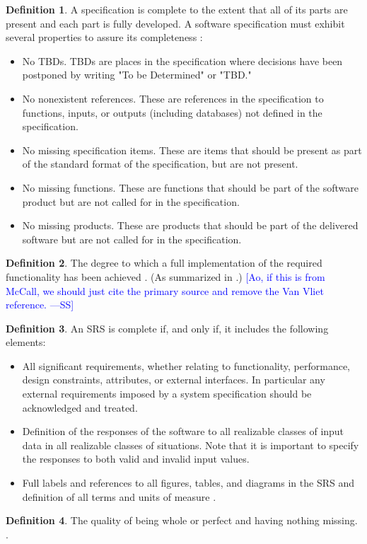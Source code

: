 \documentclass[letterpaper,cleveref]{lipics-v2019}
\newcommand{\authornote}[3]{\textcolor{#1}{[#3 ---#2]}}
\newcommand{\authornote}[3]{}
\newcommand{\wss}[1]{\authornote{blue}{SS}{#1}} %
\theoremstyle{definition}
\newtheorem{defn}{Definition}
\begin{document}
\begin{defn}
  \label{CompletenessSelected}
  A specification is complete to the extent that all of its parts are present
  and each part is fully developed. A software specification must exhibit
  several properties to assure its completeness \citep{Boehm1984}:
  \begin{itemize}
  \item No TBDs. TBDs are places in the specification where decisions have been
    postponed by writing "To be Determined" or "TBD."
  \item No nonexistent references. These are references in the specification to
    functions, inputs, or outputs (including databases) not defined in the
    specification.
  \item No missing specification items. These are items that should be present
    as part of the standard format of the specification, but are not present.
  \item No missing functions. These are functions that should be part of the
    software product but are not called for in the specification.
  \item No missing products. These are products that should be part of the
    delivered software but are not called for in the specification.
  \end{itemize}
\end{defn}

\begin{defn}
  The degree to which a full implementation of the required functionality has
  been achieved \citep{McCallEtAl1977}. (As summarized in \citet{VanVliet2000}.)
  \wss{Ao, if this is from McCall, we should just cite the primary source and
    remove the Van Vliet reference.}
\end{defn}

\begin{defn}
	An SRS is complete if, and only if, it includes the following elements:
\begin{itemize}
\item All significant requirements, whether relating to functionality,
performance, design constraints, attributes, or external interfaces. In
particular any external requirements imposed by a system specification should be
acknowledged and treated.
\item Definition of the responses of the software to all realizable classes of
input data in all realizable classes of situations. Note that it is important to
specify the responses to both valid and invalid input values.
\item Full labels and references to all figures, tables, and diagrams in the SRS
and definition of all terms and units of measure \citep{IEEE1998}.
	\end{itemize}
\end{defn}
\begin{defn}
The quality of being whole or perfect and having nothing missing.
\citep{CambridgeCompleteness2019}.
\end{defn}
\end{document}
